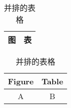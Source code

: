 \begin{table}
  \centering
  \caption{并排的表格}
  \begin{tabular}{|c|c|}
    \hline 图 & 表 \\ \hline
  \end{tabular}%
  \qquad
  \begin{tabular}{|c|c|}
    \hline Figure & Table \\ \hline A & B \\ \hline
  \end{tabular}
\end{table}
